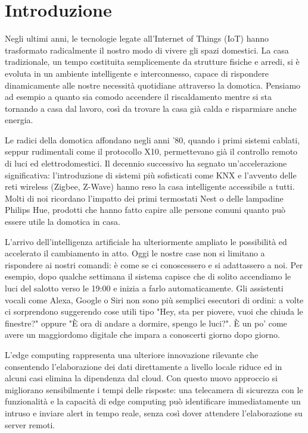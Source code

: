 \chapter{Introduzione}
Negli ultimi anni, le tecnologie legate all'Internet of Things (IoT) hanno trasformato radicalmente il nostro modo di vivere gli spazi domestici. La casa tradizionale, un tempo costituita semplicemente da strutture fisiche e arredi, si è evoluta in un ambiente intelligente e interconnesso, capace di rispondere dinamicamente alle nostre necessità quotidiane attraverso la domotica. Pensiamo ad esempio a quanto sia comodo accendere il riscaldamento mentre si sta tornando a casa dal lavoro, così da trovare la casa già calda e risparmiare anche energia.

\vspace{0.5cm}
Le radici della domotica affondano negli anni '80, quando i primi sistemi cablati, seppur rudimentali come il protocollo X10, permettevano già il controllo remoto di luci ed elettrodomestici. Il decennio successivo ha segnato un'accelerazione significativa: l'introduzione di sistemi più sofisticati come KNX e l'avvento delle reti wireless (Zigbee, Z-Wave) hanno reso la casa intelligente accessibile a tutti. Molti di noi ricordano l'impatto dei primi termostati Nest o delle lampadine Philips Hue, prodotti che hanno fatto capire alle persone comuni quanto può essere utile la domotica in casa.

\vspace{0.5cm}
L'arrivo dell'intelligenza artificiale ha ulteriormente ampliato le possibilità ed accelerato il cambiamento in atto. Oggi le nostre case non si limitano a rispondere ai nostri comandi: è come se ci conoscessero e si adattassero a noi. Per esempio, dopo qualche settimana il sistema capisce che di solito accendiamo le luci del salotto verso le 19:00 e inizia a farlo automaticamente. Gli assistenti vocali come Alexa, Google o Siri non sono più semplici esecutori di ordini: a volte ci sorprendono suggerendo cose utili tipo "Hey, sta per piovere, vuoi che chiuda le finestre?" oppure "È ora di andare a dormire, spengo le luci?". È un po' come avere un maggiordomo digitale che impara a conoscerti giorno dopo giorno.

\vspace{0.5cm}
L'edge computing rappresenta una ulteriore innovazione rilevante che consentendo l'elaborazione dei dati direttamente a livello locale riduce ed in alcuni casi elimina la dipendenza dal cloud. Con questo nuovo approccio si migliorano sensibilmente i tempi delle risposte: una telecamera di sicurezza con le funzionalità e la capacità di edge computing può identificare immediatamente un intruso e inviare alert in tempo reale, senza così dover attendere l'elaborazione su server remoti.


